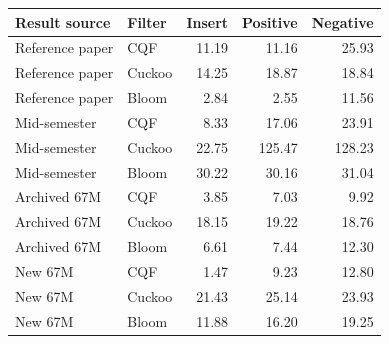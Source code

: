 \begin{tabular}{@{}llrrr@{}}
\toprule
\textbf{Result source} & \textbf{Filter} & \textbf{Insert} & \textbf{Positive} & \textbf{Negative} \\
\midrule
Reference paper & CQF & 11.19 & 11.16 & 25.93 \\
Reference paper & Cuckoo & 14.25 & 18.87 & 18.84 \\
Reference paper & Bloom & 2.84 & 2.55 & 11.56 \\
Mid-semester & CQF & 8.33 & 17.06 & 23.91 \\
Mid-semester & Cuckoo & 22.75 & 125.47 & 128.23 \\
Mid-semester & Bloom & 30.22 & 30.16 & 31.04 \\
Archived 67M & CQF & 3.85 & 7.03 & 9.92 \\
Archived 67M & Cuckoo & 18.15 & 19.22 & 18.76 \\
Archived 67M & Bloom & 6.61 & 7.44 & 12.30 \\
New 67M & CQF & 1.47 & 9.23 & 12.80 \\
New 67M & Cuckoo & 21.43 & 25.14 & 23.93 \\
New 67M & Bloom & 11.88 & 16.20 & 19.25 \\
\bottomrule
\end{tabular}
